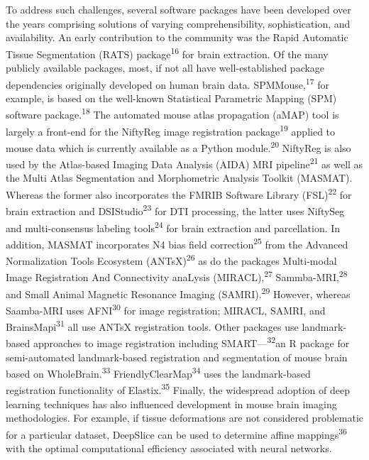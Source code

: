 \documentclass[
  12pt,
]{article}
\begin{document}
To address such challenges, several software packages have been
developed over the years comprising solutions of varying
comprehensibility, sophistication, and availability. An early
contribution to the community was the Rapid Automatic Tissue
Segmentation (RATS) package\textsuperscript{16} for brain extraction. Of
the many publicly available packages, most, if not all have
well-established package dependencies originally developed on human
brain data. SPMMouse,\textsuperscript{17} for example, is based on the
well-known Statistical Parametric Mapping (SPM) software
package.\textsuperscript{18} The automated mouse atlas propagation
(aMAP) tool is largely a front-end for the NiftyReg image registration
package\textsuperscript{19} applied to mouse data which is currently
available as a Python module.\textsuperscript{20} NiftyReg is also used
by the Atlas-based Imaging Data Analysis (AIDA) MRI
pipeline\textsuperscript{21} as well as the Multi Atlas Segmentation and
Morphometric Analysis Toolkit (MASMAT). Whereas the former also
incorporates the FMRIB Software Library (FSL)\textsuperscript{22} for
brain extraction and DSIStudio\textsuperscript{23} for DTI processing,
the latter uses NiftySeg and multi-consensus labeling
tools\textsuperscript{24} for brain extraction and parcellation. In
addition, MASMAT incorporates N4 bias field
correction\textsuperscript{25} from the Advanced Normalization Tools
Ecosystem (ANTsX)\textsuperscript{26} as do the packages Multi-modal
Image Registration And Connectivity anaLysis
(MIRACL),\textsuperscript{27} Sammba-MRI,\textsuperscript{28} and Small
Animal Magnetic Resonance Imaging (SAMRI).\textsuperscript{29} However,
whereas Saamba-MRI uses AFNI\textsuperscript{30} for image registration;
MIRACL, SAMRI, and BrainsMapi\textsuperscript{31} all use ANTsX
registration tools. Other packages use landmark-based approaches to
image registration including SMART---\textsuperscript{32}an R package
for semi-automated landmark-based registration and segmentation of mouse
brain based on WholeBrain.\textsuperscript{33}
FriendlyClearMap\textsuperscript{34} uses the landmark-based
registration functionality of Elastix.\textsuperscript{35} Finally, the
widespread adoption of deep learning techniques has also influenced
development in mouse brain imaging methodologies. For example, if tissue
deformations are not considered problematic for a particular dataset,
DeepSlice can be used to determine affine mappings\textsuperscript{36}
with the optimal computational efficiency associated with neural
networks.
\end{document}

